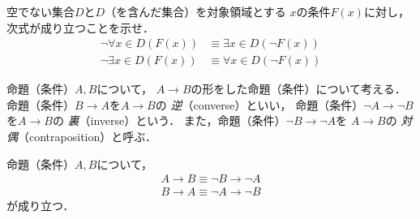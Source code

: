    \begin{que} \label{que:Dnarabanot}
     空でない集合$D$と$D$（を含んだ集合）を対象領域とする
     $x$の条件$F(x)$に対し，次式が成り立つことを示せ．
     \begin{align}
       \lnot \forall x \in D ( F(x) ) & \equiv \exists x \in D ( \lnot F(x) ) 
       \label{eq:Dnotall} \\
       \lnot \exists x \in D (F(x) ) & \equiv \forall x \in D ( \lnot F(x) )
       \label{eq:Dnotexists} 
     \end{align}
   \end{que}



   命題（条件）$A ,  B$について，
   $A \to B$の形をした命題（条件）について考える．
   命題（条件）$B \to A$を$A \to B$の
   \emph{逆}（converse）といい，
   命題（条件）$\lnot A \to \lnot B$を$A \to B$の
   \emph{裏}（inverse）という．
   また，命題（条件）$\lnot B \to  \lnot A$を
   $A \to B $の
   \emph{対偶}（contraposition）と呼ぶ．
   \begin{thm} \label{thm:taiguu}
     命題（条件）$A,  B$について，
     \begin{align}
       A \to B \equiv \lnot B \to \lnot A 
       \label{eq:taiguudouti} \\
       B \to A \equiv \lnot A \to \lnot B
       \label{eq:gyakudouti}
     \end{align}
     が成り立つ．
   \end{thm}
   
